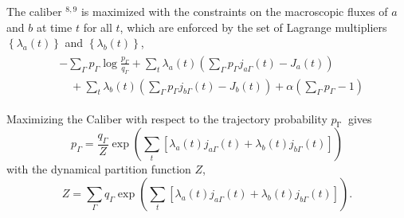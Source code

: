 \documentclass[aps,pra,twocolumn]{revtex4-1}
\begin{document}
The caliber ${ }^{8,9}$ is maximized with the constraints on the macroscopic fluxes of $a$ and $b$ at time $t$ for all $t$, which are enforced by the set of Lagrange multipliers $\left\{\lambda_a(t)\right\}$ and $\left\{\lambda_b(t)\right\}$,
\begin{eqnarray}
\begin{aligned}
& -\sum_{\Gamma} p_{\Gamma} \log \frac{p_{\Gamma}}{q_{\Gamma}}+\sum_t \lambda_a(t)\left(\sum_{\Gamma} p_{\Gamma} j_{a \Gamma}(t)-J_a(t)\right) \nonumber\\
& \quad+\sum_t \lambda_b(t)\left(\sum_{\Gamma} p_{\Gamma} j_{b \Gamma}(t)-J_b(t)\right)+\alpha\left(\sum_{\Gamma} p_{\Gamma}-1\right)
\end{aligned}
\end{eqnarray}

Maximizing the Caliber with respect to the trajectory probability $p_{\text {Г }}$ gives
\begin{equation}
p_{\Gamma}=\frac{q_{\Gamma}}{Z} \exp \left(\sum_t\left[\lambda_a(t) j_{a \Gamma}(t)+\lambda_b(t) j_{b \Gamma}(t)\right]\right) \label{eq:trajectory_probability}
\end{equation}
with the dynamical partition function $Z$,
\begin{equation}
Z=\sum_{\Gamma} q_{\Gamma} \exp \left(\sum_t\left[\lambda_a(t) j_{a \Gamma}(t)+\lambda_b(t) j_{b \Gamma}(t)\right]\right). \label{eq:dynamical_partition_function}
\end{equation}
\end{document}
